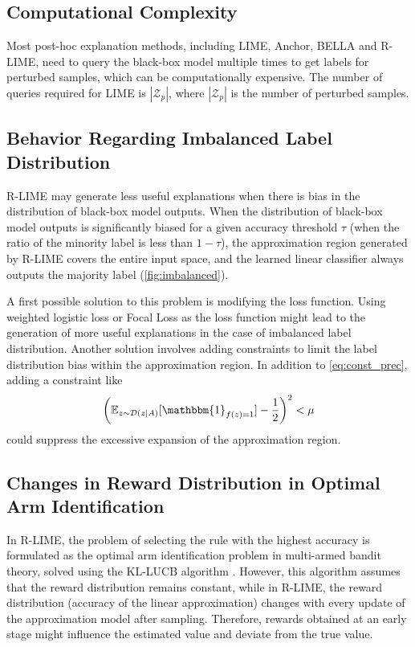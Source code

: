 \documentclass[runningheads]{llncs}
\begin{document}
\subsection{Computational Complexity}
Most post-hoc explanation methods, including LIME, Anchor, BELLA and R-LIME,
need to query the black-box model multiple times
to get labels for perturbed samples, which can be computationally expensive.
The number of queries required for LIME is $|\mathcal{Z}_p|$,
where $|\mathcal{Z}_p|$ is the number of perturbed samples.

\subsection{Behavior Regarding Imbalanced Label Distribution}
R-LIME may generate less useful explanations
when there is bias in the distribution of black-box model outputs.
When the distribution of black-box model outputs is significantly biased
for a given accuracy threshold $\tau$
(when the ratio of the minority label is less than $1-\tau$),
the approximation region generated by R-LIME covers the entire input space,
and the learned linear classifier always outputs the majority label
(\cref{fig:imbalanced}).

A first possible solution to this problem is modifying the loss function.
Using weighted logistic loss or Focal Loss \cite{lin2020focal}
as the loss function might lead to the generation of more useful explanations
in the case of imbalanced label distribution.
Another solution involves adding constraints
to limit the label distribution bias within the approximation region.
In addition to \cref{eq:const_prec}, adding a constraint like
\begin{equation}
	{\left(\mathbb{E}_{z\sim\mathcal{D}(z\mid A)}[\mathbbm{1}_{f(z)=1}]-\frac{1}{2}\right)}^2<\mu
\end{equation}
could suppress the excessive expansion of the approximation region.

\subsection{Changes in Reward Distribution in Optimal Arm Identification}\label{sec:reward}
{%
	\renewcommand{\arraystretch}{1.1}
	\begin{table}[tbp]
		\centering
		\caption{%
			Deviation between the estimated accuracy and the true accuracy.
			Deviation was relatively small considering confidence level $1-\delta=0.95$.
		}\label{tab:reward}
		
	\end{table}
}
In R-LIME,
the problem of selecting the rule with the highest accuracy is formulated
as the optimal arm identification problem in multi-armed bandit theory,
solved using the KL-LUCB algorithm \cite{kaufmann2013information}.
However, this algorithm assumes that the reward distribution remains constant,
while in R-LIME,
the reward distribution (accuracy of the linear approximation)
changes with every update of the approximation model after sampling.
Therefore, rewards obtained at an early stage
might influence the estimated value and deviate from the true value.
\end{document}
